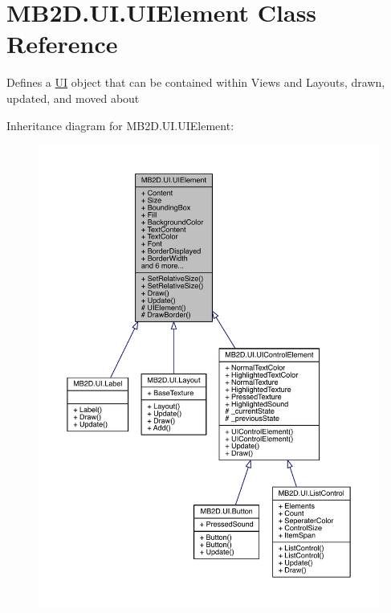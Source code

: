 \hypertarget{class_m_b2_d_1_1_u_i_1_1_u_i_element}{}\section{M\+B2\+D.\+U\+I.\+U\+I\+Element Class Reference}
\label{class_m_b2_d_1_1_u_i_1_1_u_i_element}


Defines a \hyperlink{namespace_m_b2_d_1_1_u_i}{UI} object that can be contained within Views and Layouts, drawn, updated, and moved about  




Inheritance diagram for M\+B2\+D.\+U\+I.\+U\+I\+Element\+:
\nopagebreak
\begin{figure}[H]
\begin{center}
\leavevmode
\includegraphics[width=350pt]{class_m_b2_d_1_1_u_i_1_1_u_i_element__inherit__graph}
\end{center}
\end{figure}


